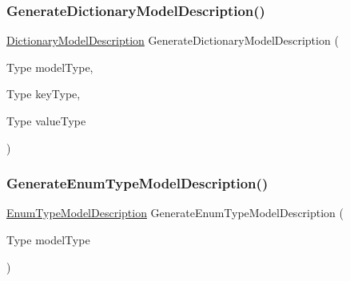 \subsubsection{\texorpdfstring{Generate\+Dictionary\+Model\+Description()}{GenerateDictionaryModelDescription()}}
{\footnotesize\ttfamily \hyperlink{classApi3Layers_1_1Areas_1_1HelpPage_1_1ModelDescriptions_1_1DictionaryModelDescription}{Dictionary\+Model\+Description} Generate\+Dictionary\+Model\+Description (\begin{DoxyParamCaption}\item[{Type}]{model\+Type,  }\item[{Type}]{key\+Type,  }\item[{Type}]{value\+Type }\end{DoxyParamCaption})\hspace{0.3cm}{\ttfamily [private]}}

\mbox{\label{classApi3Layers_1_1Areas_1_1HelpPage_1_1ModelDescriptions_1_1ModelDescriptionGenerator_a109bbcef4577be599414712bd9c04418}} 
\subsubsection{\texorpdfstring{Generate\+Enum\+Type\+Model\+Description()}{GenerateEnumTypeModelDescription()}}
{\footnotesize\ttfamily \hyperlink{classApi3Layers_1_1Areas_1_1HelpPage_1_1ModelDescriptions_1_1EnumTypeModelDescription}{Enum\+Type\+Model\+Description} Generate\+Enum\+Type\+Model\+Description (\begin{DoxyParamCaption}\item[{Type}]{model\+Type }\end{DoxyParamCaption})\hspace{0.3cm}{\ttfamily [private]}}

